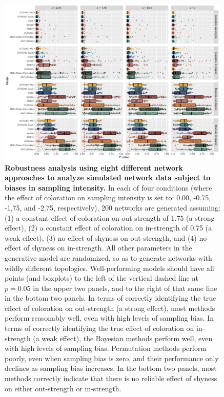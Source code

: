 \documentclass[Afour,sageh,times]{sagej}
\begin{document}
\begin{figure}[t]
  \caption{\textbf{Robustness analysis using eight different network approaches to analyze simulated network data subject to biases in sampling intensity.} In each of four conditions (where the effect of coloration on sampling intensity is set to: 0.00, -0.75, -1,75, and -2.75, respectively), 200 networks are generated assuming: (1) a constant effect of coloration on out-strength of 1.75 (a strong effect),  (2) a constant effect of coloration on in-strength of 0.75 (a weak effect), (3) no effect of shyness on out-strength, and (4) no effect of shyness on in-strength. All other parameters in the generative model are randomized, so as to generate networks with wildly different topologies. Well-performing models should have all points (and boxplots) to the left of the vertical dashed line at $p=0.05$ in the upper two panels, and to the right of that same line in the bottom two panels.  %
  In terms of correctly identifying the true effect of coloration on out-strength (a strong effect), most methods perform reasonably well, even with high levels of sampling bias.  In terms of correctly identifying the true effect of coloration on in-strength (a weak effect), the Bayesian methods perform well, even with high levels of sampling bias. Permutation methods perform poorly, even when sampling bias is zero, and their performance only declines as sampling bias increases.  In the bottom two panels, most methods correctly indicate that there is no reliable effect of shyness on either out-strength or in-strength.
  }  \label{blast1}
  \centering
      \includegraphics[width=0.99\textwidth]{Figures/Sampling_Robustness_data.pdf}
\end{figure}
\end{document}
